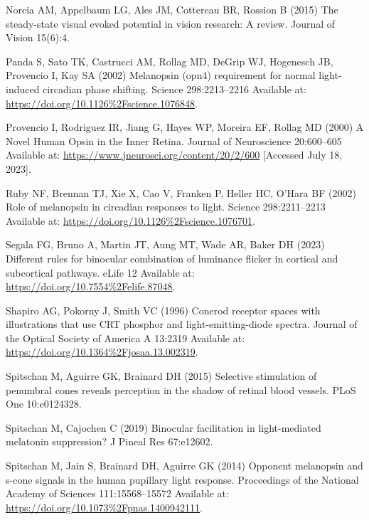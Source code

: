 \documentclass[
]{article}
\begin{document}
\leavevmode\hypertarget{ref-Norcia2015}{}%
Norcia AM, Appelbaum LG, Ales JM, Cottereau BR, Rossion B (2015) The steady-state visual evoked potential in vision research: A review. Journal of Vision 15(6):4.

\leavevmode\hypertarget{ref-Panda2002}{}%
Panda S, Sato TK, Castrucci AM, Rollag MD, DeGrip WJ, Hogenesch JB, Provencio I, Kay SA (2002) Melanopsin (opn4) requirement for normal light-induced circadian phase shifting. Science 298:2213--2216 Available at: \url{https://doi.org/10.1126\%2Fscience.1076848}.

\leavevmode\hypertarget{ref-Provencio2000}{}%
Provencio I, Rodriguez IR, Jiang G, Hayes WP, Moreira EF, Rollag MD (2000) A Novel Human Opsin in the Inner Retina. Journal of Neuroscience 20:600--605 Available at: \url{https://www.jneurosci.org/content/20/2/600} {[}Accessed July 18, 2023{]}.

\leavevmode\hypertarget{ref-Ruby2002}{}%
Ruby NF, Brennan TJ, Xie X, Cao V, Franken P, Heller HC, O'Hara BF (2002) Role of melanopsin in circadian responses to light. Science 298:2211--2213 Available at: \url{https://doi.org/10.1126\%2Fscience.1076701}.

\leavevmode\hypertarget{ref-Segala2023}{}%
Segala FG, Bruno A, Martin JT, Aung MT, Wade AR, Baker DH (2023) Different rules for binocular combination of luminance flicker in cortical and subcortical pathways. eLife 12 Available at: \url{https://doi.org/10.7554\%2Felife.87048}.

\leavevmode\hypertarget{ref-Shapiro1996}{}%
Shapiro AG, Pokorny J, Smith VC (1996) Conerod receptor spaces with illustrations that use CRT phosphor and light-emitting-diode spectra. Journal of the Optical Society of America A 13:2319 Available at: \url{https://doi.org/10.1364\%2Fjosaa.13.002319}.

\leavevmode\hypertarget{ref-Spitschan2015}{}%
Spitschan M, Aguirre GK, Brainard DH (2015) Selective stimulation of penumbral cones reveals perception in the shadow of retinal blood vessels. PLoS One 10:e0124328.

\leavevmode\hypertarget{ref-Spitschan2019}{}%
Spitschan M, Cajochen C (2019) Binocular facilitation in light-mediated melatonin suppression? J Pineal Res 67:e12602.

\leavevmode\hypertarget{ref-Spitschan2014}{}%
Spitschan M, Jain S, Brainard DH, Aguirre GK (2014) Opponent melanopsin and s-cone signals in the human pupillary light response. Proceedings of the National Academy of Sciences 111:15568--15572 Available at: \url{https://doi.org/10.1073\%2Fpnas.1400942111}.
\end{document}
